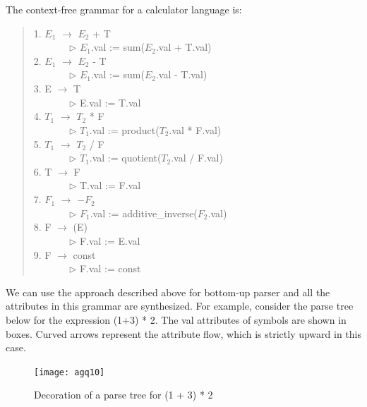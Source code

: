 \documentclass[a4paper,12pt]{article}
\begin{document}
The context-free grammar for a calculator language is:\\
\begin{quote}
1. $E_1$ $\longrightarrow$ $E_2$ + T \\
\verb+       +$\triangleright$ $E_1$.val := sum($E_2$.val + T.val)\\
2. $E_1$ $\longrightarrow$ $E_2$ - T \\
\verb+       +$\triangleright$ $E_1$.val := sum($E_2$.val - T.val)\\
3. E $\longrightarrow$  T \\
\verb+       +$\triangleright$ E.val := T.val\\
4. $T_1$ $\longrightarrow$ $T_2$ * F \\
\verb+       +$\triangleright$ $T_1$.val := product($T_2$.val * F.val)\\
5. $T_1$ $\longrightarrow$ $T_2$ / F \\
\verb+       +$\triangleright$ $T_1$.val := quotient($T_2$.val / F.val)\\
6. T $\longrightarrow$  F \\
\verb+       +$\triangleright$ T.val := F.val\\
7. $F_1$ $\longrightarrow$ $-F_2$\\
\verb+       +$\triangleright$ $F_1$.val := additive\_inverse($F_2$.val)\\
8. F $\longrightarrow$  (E) \\
\verb+       +$\triangleright$ F.val := E.val\\
9. F $\longrightarrow$ const\\
\verb+       +$\triangleright$ F.val := const\\
\end{quote}
We can use the approach described above for bottom-up parser and all the attributes in this grammar are synthesized.
For example, consider the parse tree below for the expression (1+3) * 2. The val attributes of symbols are shown in boxes. Curved arrows represent the attribute flow, which is strictly upward in this case.
\begin{figure}[!hbp]
\centering
\texttt{[image: agq10]}
\caption{Decoration of a parse tree for (1 + 3) * 2 }
\end{figure}
\end{document}
